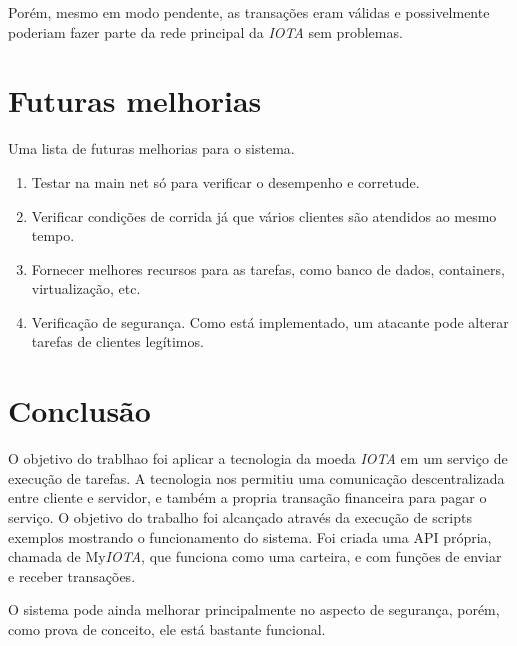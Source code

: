 \documentclass[a4paper]{article}
\begin{document}
Porém, mesmo em modo pendente, as transações eram válidas e possivelmente poderiam fazer parte da rede principal da \textit{IOTA}
sem problemas.

\section{Futuras melhorias}\label{sec:Future}

Uma lista de futuras melhorias para o sistema.

\begin{enumerate}
\item Testar na main net só para verificar o desempenho e corretude.
\item Verificar condições de corrida já que vários clientes são atendidos ao mesmo tempo.
\item Fornecer melhores recursos para as tarefas, como banco de dados, containers, virtualização, etc.
\item Verificação de segurança. Como está implementado, um atacante pode alterar tarefas de clientes legítimos.
\end{enumerate}

\section{Conclusão}
O objetivo do trablhao foi aplicar a tecnologia da moeda \textit{IOTA} em um serviço de execução de tarefas. A tecnologia nos permitiu uma
comunicação descentralizada entre cliente e servidor, e também a propria transação financeira para pagar o serviço. O objetivo do
trabalho foi alcançado através da execução de scripts exemplos mostrando o funcionamento do sistema. Foi criada uma API própria,
chamada de My\textit{IOTA}, que funciona como uma carteira, e com funções de enviar e receber transações.

O sistema pode ainda melhorar principalmente no aspecto de segurança, porém, como prova de conceito, ele está bastante funcional.

%
%
\end{document}
